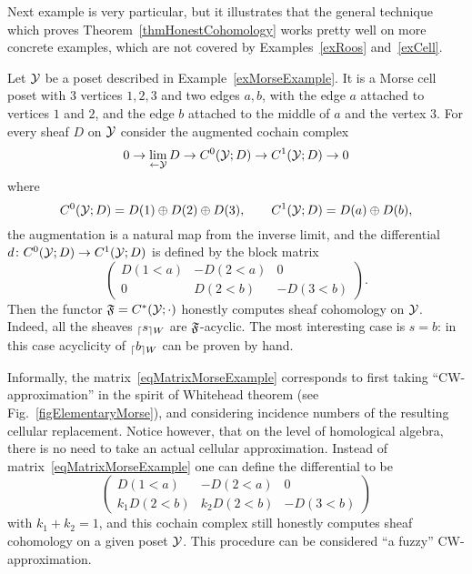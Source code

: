 Next example is very particular, but it illustrates that the general technique which proves Theorem~\ref{thmHonestCohomology} works pretty well on more concrete examples, which are not covered by Examples~\ref{exRoos} and~\ref{exCell}.

\begin{ex}\label{exMorse}
Let $\mathcal{Y}$ be a poset described in Example~\ref{exMorseExample}. It is a Morse cell poset with 3 vertices $1,2,3$ and two edges $a,b$, with the edge $a$ attached to vertices $1$ and $2$, and the edge $b$ attached to the middle of $a$ and the vertex $3$. For every sheaf $D$ on $\mathcal{Y}$ consider the augmented cochain complex
\[
0\to \lim\limits_{\leftarrow \mathcal{Y}} D\to C^0(\mathcal{Y};D)\to C^1(\mathcal{Y};D)\to 0
\]
where
\[
C^0(\mathcal{Y};D)=D(1)\oplus D(2)\oplus D(3), \qquad C^1(\mathcal{Y};D)=D(a)\oplus D(b),
\]
the augmentation is a natural map from the inverse limit, and the differential $d\colon C^0(\mathcal{Y};D)\to C^1(\mathcal{Y};D)$ is defined by the block matrix
\begin{equation}\label{eqMatrixMorseExample}
\begin{pmatrix}
  D(1<a) & -D(2<a) & 0 \\
  0 & D(2<b) & -D(3<b)
\end{pmatrix}.
\end{equation}
Then the functor $\mathfrak{F} = C^*(\mathcal{Y};\cdot)$ honestly computes sheaf cohomology on $\mathcal{Y}$. Indeed, all the sheaves ${_{\lceil}s_{\rceil W}}$ are $\mathfrak{F}$-acyclic. The most interesting case is $s=b$: in this case acyclicity of ${_{\lceil}b_{\rceil W}}$ can be proven by hand.

Informally, the matrix~\eqref{eqMatrixMorseExample} corresponds to first taking ``CW-approximation'' in the spirit of Whitehead theorem (see Fig.~\ref{figElementaryMorse}), and considering incidence numbers of the resulting cellular replacement. Notice however, that on the level of homological algebra, there is no need to take an actual cellular approximation. Instead of matrix~\eqref{eqMatrixMorseExample} one can define the differential to be
\begin{equation}\label{eqMatrixMorseExampleAlternative}
\begin{pmatrix}
  D(1<a) & -D(2<a) & 0 \\
  k_1D(2<b) & k_2D(2<b) & -D(3<b)
\end{pmatrix}
\end{equation}
with $k_1+k_2=1$, and this cochain complex still honestly computes sheaf cohomology on a given poset $\mathcal{Y}$. This procedure can be considered ``a fuzzy'' CW-approximation.
\end{ex}

